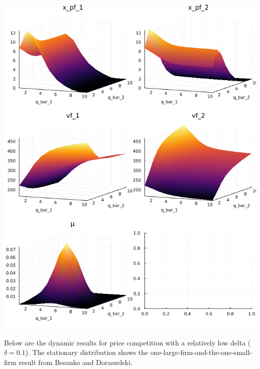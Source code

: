 \documentclass{article}
\begin{document}
\includegraphics[scale=.65]{q_high_delta_dynamic.png}

\pagebreak

Below are the dynamic results for price competition with a relatively low delta ($\delta = 0.1$). The stationary distribution shows the one-large-firm-and-the-one-small-firm result from Besanko and Doraszelski.
\end{document}
